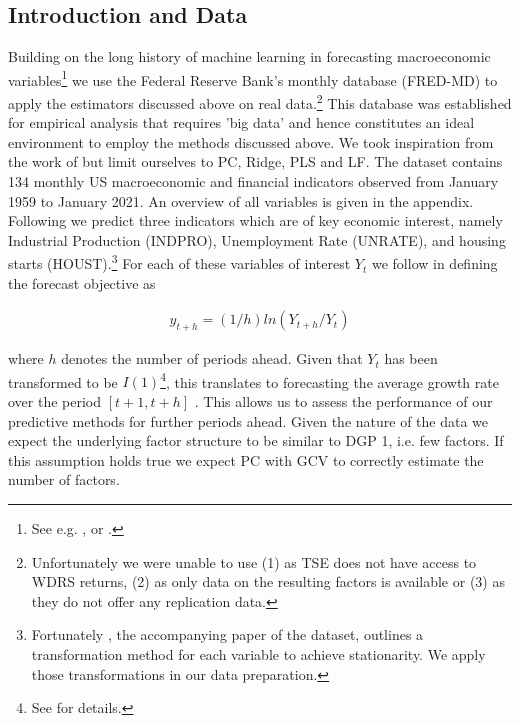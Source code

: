 \subsection{Introduction and Data}
Building on the long history of machine learning in forecasting macroeconomic variables\footnote{See e.g. \cite{swanson1997model}, \cite{stock1998comparison} or \cite{stock2002macroeconomic}.} we use the Federal Reserve Bank's monthly database (FRED-MD) to apply the estimators discussed above on real data.\footnote{Unfortunately we were unable to use (1) \cite{gu2020empirical} as TSE does not have access to WDRS returns, (2) \cite{ludvigson2009macro} as only data on the resulting factors is available or (3) \cite{stock2002macroeconomic} as they do not offer any replication data.} This database was established for empirical analysis that requires 'big data' and hence constitutes an ideal environment to employ the methods discussed above. We took inspiration from the work of \citeauthor{coulombe2020machine} but limit ourselves to PC, Ridge, PLS and LF. 
The dataset contains 134 monthly US macroeconomic and financial indicators observed from January 1959 to January 2021. An overview of all variables is given in the appendix. 
Following \citeauthor{coulombe2020machine} we predict three indicators which are of key economic interest, namely Industrial Production (INDPRO), Unemployment Rate (UNRATE), and housing starts (HOUST).\footnote{Fortunately \cite{mccracken2016fred}, the accompanying paper of the dataset, outlines a transformation method for each variable to achieve stationarity. We apply those transformations in our data preparation.}
For each of these variables of interest $Y_t$ we follow \citeauthor{coulombe2020machine} in defining the forecast objective as

\begin{align*}
	y_{t+h} = (1/h) ln(Y_{t+h}/Y_t)
\end{align*}

where $h$ denotes the number of periods ahead.  Given that $Y_t$ has been transformed to be $I(1)$\footnote{See \cite{mccracken2016fred} for details.}, this translates to forecasting the average growth rate over the period $[t + 1, t + h]$ \parencite{stock2002macroeconomic}. This allows us to assess the performance of our predictive methods for further periods ahead.
Given the nature of the data we expect the underlying factor structure to be similar to DGP 1, i.e. few factors. \parencite{mccracken2016fred} If this assumption holds true we expect PC with GCV to correctly estimate the number of factors. 


